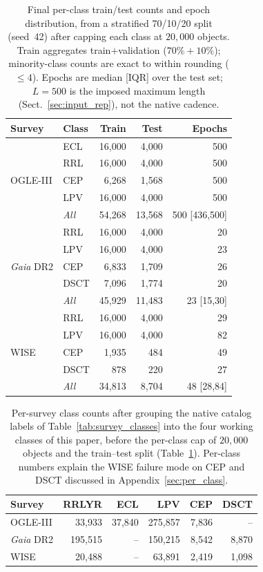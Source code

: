 \documentclass{aa}
\begin{document}
\begin{table}[htbp]\centering
\caption{Final per-class train/test counts and epoch distribution, from a stratified 70/10/20 split (seed~42) after capping each class at $20{,}000$ objects. Train aggregates train$+$validation ($70\%+10\%$); minority-class counts are exact to within rounding ($\le4$). Epochs are median [IQR] over the test set; $L=500$ is the imposed maximum length (Sect.~\ref{sec:input_rep}), not the native cadence.}
\label{tab:counts}
\footnotesize
\begin{tabular}{llrrr}
\toprule
Survey & Class & Train & Test & Epochs\\
\midrule
\multirow{5}{*}{OGLE-III}
 & ECL & 16,000 & 4,000 & 500\\
 & RRL & 16,000 & 4,000 & 500\\
 & CEP & 6,268 & 1,568 & 500\\
 & LPV & 16,000 & 4,000 & 500\\
 & \emph{All} & 54,268 & 13,568 & 500 [436,500]\\
\midrule
\multirow{5}{*}{\textit{Gaia} DR2}
 & RRL & 16,000 & 4,000 & 20\\
 & LPV & 16,000 & 4,000 & 23\\
 & CEP & 6,833 & 1,709 & 26\\
 & DSCT & 7,096 & 1,774 & 20\\
 & \emph{All} & 45,929 & 11,483 & 23 [15,30]\\
\midrule
\multirow{5}{*}{WISE}
 & RRL & 16,000 & 4,000 & 29\\
 & LPV & 16,000 & 4,000 & 82\\
 & CEP & 1,935 & 484 & 49\\
 & DSCT & 878 & 220 & 27\\
 & \emph{All} & 34,813 & 8,704 & 48 [28,84]\\
\bottomrule
\end{tabular}
\end{table}

\begin{table}[htbp]
\centering
\caption{Per-survey class counts after grouping the native catalog labels of Table~\ref{tab:survey_classes} into the four working classes of this paper, before the per-class cap of $20{,}000$ objects and the train--test split (Table~\ref{tab:counts}). Per-class numbers explain the WISE failure mode on CEP and DSCT discussed in Appendix~\ref{sec:per_class}.}
\label{tab:class_balance}
\small
\begin{tabular}{lrrrrr}
\toprule
Survey & RRLYR & ECL & LPV & CEP & DSCT \\
\midrule
OGLE-III & 33{,}933 & 37{,}840 & 275{,}857 & 7{,}836 & -- \\
\textit{Gaia} DR2 & 195{,}515 & -- & 150{,}215 & 8{,}542 & 8{,}870 \\
WISE & 20{,}488 & -- & 63{,}891 & 2{,}419 & 1{,}098 \\
\bottomrule
\end{tabular}
\end{table}
\end{document}
